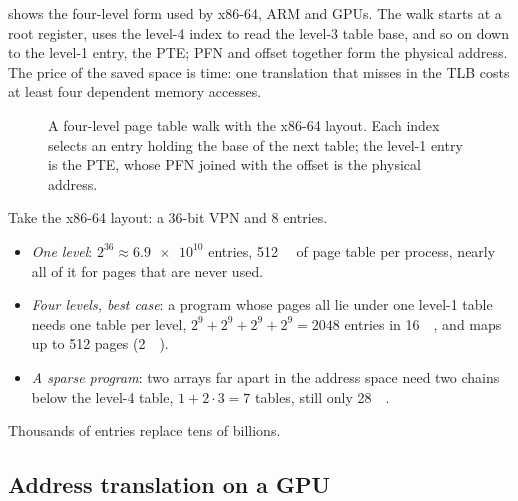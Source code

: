 \documentclass[../main.tex]{subfiles}
\begin{document}
 shows the four-level form used by x86-64,
ARM and GPUs.  The
walk starts at a root register, uses the level-4
index to read the level-3 table base, and so on down to the level-1
entry, the PTE; PFN and offset together form the physical address.
The price of the saved space is time: one translation that misses in
the TLB costs at least four dependent memory accesses.

\begin{figure}[tb]
  \centering
  
  \caption{A four-level page table walk with the x86-64 layout.  Each
    index selects an entry holding the base of the next table; the
    level-1 entry is the PTE, whose PFN joined with the offset is the
    physical address.}
  \label{fig:l07-page-walk}
\end{figure}

\begin{example}
  \label{ex:l07-table-size}
  Take the x86-64 layout: a 36-bit VPN and \SI{8}{\byte} entries.
  \begin{itemize}
    \item \emph{One level}: $2^{36} \approx \num{6.9e10}$ entries,
      \SI{512}{\gibi\byte} of page table per process, nearly all of it
      for pages that are never used.
    \item \emph{Four levels, best case}: a program whose pages all lie
      under one level-1 table needs one table per level,
      $2^9+2^9+2^9+2^9 = \num{2048}$ entries in
      \SI{16}{\kibi\byte}, and maps up to 512 pages
      (\SI{2}{\mebi\byte}).
    \item \emph{A sparse program}: two arrays far apart in the address
      space need two chains below the level-4 table, $1+2\cdot3 = 7$
      tables, still only \SI{28}{\kibi\byte}.
  \end{itemize}
  Thousands of entries replace tens of billions.
\end{example}

\subsection{Address translation on a GPU}
\end{document}
